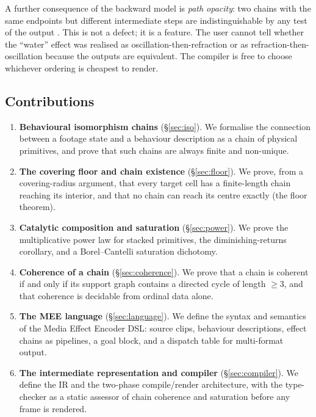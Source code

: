 \documentclass[twocolumn,11pt,a4paper]{article}
\theoremstyle{mee}
\theoremstyle{definition}
\theoremstyle{remark}
\begin{document}
A further consequence of the backward model is \emph{path opacity}: two
chains with the same endpoints but different intermediate steps are
indistinguishable by any test of the output \citep{kolmogorov1965}. This
is not a defect; it is a feature. The user cannot tell whether the
``water'' effect was realised as oscillation-then-refraction or as
refraction-then-oscillation because the outputs are equivalent. The
compiler is free to choose whichever ordering is cheapest to render.

\subsection{Contributions}

\begin{enumerate}[leftmargin=1.4em,itemsep=2pt]
\item \textbf{Behavioural isomorphism chains} (\S\ref{sec:iso}). We
  formalise the connection between a footage state and a behaviour
  description as a chain of physical primitives, and prove that such
  chains are always finite and non-unique.
\item \textbf{The covering floor and chain existence}
  (\S\ref{sec:floor}). We prove, from a covering-radius argument, that
  every target cell has a finite-length chain reaching its interior, and
  that no chain can reach its centre exactly (the floor theorem).
\item \textbf{Catalytic composition and saturation} (\S\ref{sec:power}).
  We prove the multiplicative power law for stacked primitives, the
  diminishing-returns corollary, and a Borel--Cantelli saturation
  dichotomy.
\item \textbf{Coherence of a chain} (\S\ref{sec:coherence}). We prove
  that a chain is coherent if and only if its support graph contains a
  directed cycle of length $\ge3$, and that coherence is decidable from
  ordinal data alone.
\item \textbf{The MEE language} (\S\ref{sec:language}). We define the
  syntax and semantics of the Media Effect Encoder DSL: source clips,
  behaviour descriptions, effect chains as pipelines, a goal block, and
  a dispatch table for multi-format output.
\item \textbf{The intermediate representation and compiler}
  (\S\ref{sec:compiler}). We define the IR and the two-phase
  compile/render architecture, with the type-checker as a static assessor
  of chain coherence and saturation before any frame is rendered.
\end{enumerate}
\end{document}
